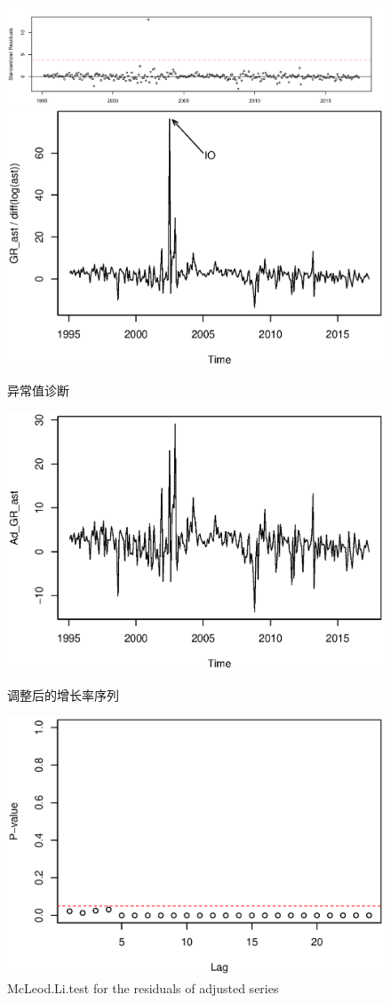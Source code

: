 \documentclass[10.5pt,onecolumn,a4paper]{article}%
\begin{document}
\begin{figure}[h!]
    \caption{异常值诊断}
    \centering
    \includegraphics[width=0.8\linewidth]{pic/srgr_ast}
    \label{fig:srgrast}
    \includegraphics[width=0.5\linewidth]{pic/io}
    \label{fig:io}
\end{figure}
\begin{figure}
    \caption{调整后的增长率序列}
    \centering
    \includegraphics[width=0.5\linewidth]{pic/adgrast}
    \label{fig:adgrast}
\end{figure}
\begin{figure}[h!]
    \begin{center}
    \includegraphics[width=0.5\linewidth]{pic/mcr2}
    \caption{McLeod.Li.test for the residuals of adjusted series}
    \label{fig:mcr2}
    \end{center}
\end{figure}
\end{document}
